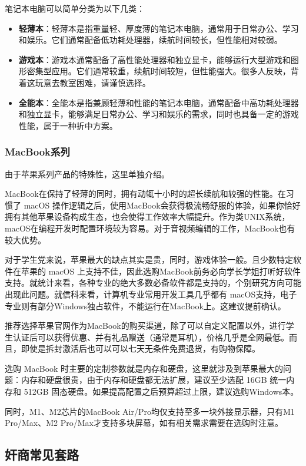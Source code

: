 \documentclass[../main.tex]{subfiles}
\begin{document}
笔记本电脑可以简单分类为以下几类：

\begin{itemize}
  \item \textbf{轻薄本}：轻薄本是指重量轻、厚度薄的笔记本电脑，通常用于日常办公、学习和娱乐。它们通常配备低功耗处理器，续航时间较长，但性能相对较弱。
  \item \textbf{游戏本}：游戏本通常配备了高性能处理器和独立显卡，能够运行大型游戏和图形密集型应用。它们通常较重，续航时间较短，但性能强大。很多人反映，背着这玩意去教室困难，请谨慎选择。
  \item \textbf{全能本}：全能本是指兼顾轻薄和性能的笔记本电脑，通常配备中高功耗处理器和独立显卡，能够满足日常办公、学习和娱乐的需求，同时也具备一定的游戏性能，属于一种折中方案。
\end{itemize}

\subsubsection{MacBook系列}
由于苹果系列产品的特殊性，这里单独介绍。

MacBook在保持了轻薄的同时，拥有动辄十小时的超长续航和较强的性能。在习惯了 macOS 操作逻辑之后，使用MacBook会获得极流畅舒服的体验，如果你恰好拥有其他苹果设备构成生态，也会使得工作效率大幅提升。作为类UNIX系统，macOS在编程开发时配置环境较为容易。对于音视频编辑的工作，MacBook也有较大优势。

对于学生党来说，苹果最大的缺点其实是贵，同时，游戏体验一般。且少数特定软件在苹果的 macOS 上支持不佳，因此选购MacBook前务必向学长学姐打听好软件支持。就统计来看，各种专业的绝大多数必备软件都是支持的，个别研究方向可能出现此问题。就信科来看，计算机专业常用开发工具几乎都有 macOS支持，电子专业则有部分Windows独占软件，不能运行在MacBook上。这建议提前确认。

推荐选择苹果官网作为MacBook的购买渠道，除了可以自定义配置以外，进行学生认证后可以获得优惠、并有礼品赠送（通常是耳机），价格几乎是全网最低。而且，即使是拆封激活后也可以可以七天无条件免费退货，有购物保障。

选购 MacBook 时主要的定制参数就是内存和硬盘，这里就涉及到苹果最大的问题：内存和硬盘很贵，由于内存和硬盘都无法扩展，建议至少选配 16GB 统一内存和 512GB 固态硬盘。如果提高配置之后预算超过上限，建议选购Windows本。

同时，M1、M2芯片的MacBook Air/Pro均仅支持至多一块外接显示器，只有M1 Pro/Max、M2 Pro/Max才支持多块屏幕，如有相关需求需要在选购时注意。

\subsection{奸商常见套路}
\end{document}
